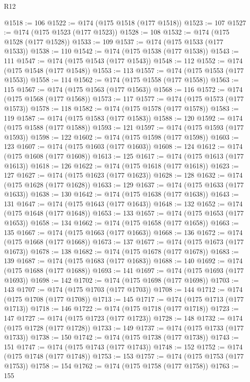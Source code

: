 \begin{lexlean}{R12}
\begin{coremodule}
@1518 := 106
@1522 := @174 (@175 @1518 (@177 @1518))
@1523 := 107
@1527 := @174 (@175 @1523 (@177 @1523))
@1528 := 108
@1532 := @174 (@175 @1528 (@177 @1528))
@1533 := 109
@1537 := @174 (@175 @1533 (@177 @1533))
@1538 := 110
@1542 := @174 (@175 @1538 (@177 @1538))
@1543 := 111
@1547 := @174 (@175 @1543 (@177 @1543))
@1548 := 112
@1552 := @174 (@175 @1548 (@177 @1548))
@1553 := 113
@1557 := @174 (@175 @1553 (@177 @1553))
@1558 := 114
@1562 := @174 (@175 @1558 (@177 @1558))
@1563 := 115
@1567 := @174 (@175 @1563 (@177 @1563))
@1568 := 116
@1572 := @174 (@175 @1568 (@177 @1568))
@1573 := 117
@1577 := @174 (@175 @1573 (@177 @1573))
@1578 := 118
@1582 := @174 (@175 @1578 (@177 @1578))
@1583 := 119
@1587 := @174 (@175 @1583 (@177 @1583))
@1588 := 120
@1592 := @174 (@175 @1588 (@177 @1588))
@1593 := 121
@1597 := @174 (@175 @1593 (@177 @1593))
@1598 := 122
@1602 := @174 (@175 @1598 (@177 @1598))
@1603 := 123
@1607 := @174 (@175 @1603 (@177 @1603))
@1608 := 124
@1612 := @174 (@175 @1608 (@177 @1608))
@1613 := 125
@1617 := @174 (@175 @1613 (@177 @1613))
@1618 := 126
@1622 := @174 (@175 @1618 (@177 @1618))
@1623 := 127
@1627 := @174 (@175 @1623 (@177 @1623))
@1628 := 128
@1632 := @174 (@175 @1628 (@177 @1628))
@1633 := 129
@1637 := @174 (@175 @1633 (@177 @1633))
@1638 := 130
@1642 := @174 (@175 @1638 (@177 @1638))
@1643 := 131
@1647 := @174 (@175 @1643 (@177 @1643))
@1648 := 132
@1652 := @174 (@175 @1648 (@177 @1648))
@1653 := 133
@1657 := @174 (@175 @1653 (@177 @1653))
@1658 := 134
@1662 := @174 (@175 @1658 (@177 @1658))
@1663 := 135
@1667 := @174 (@175 @1663 (@177 @1663))
@1668 := 136
@1672 := @174 (@175 @1668 (@177 @1668))
@1673 := 137
@1677 := @174 (@175 @1673 (@177 @1673))
@1678 := 138
@1682 := @174 (@175 @1678 (@177 @1678))
@1683 := 139
@1687 := @174 (@175 @1683 (@177 @1683))
@1688 := 140
@1692 := @174 (@175 @1688 (@177 @1688))
@1693 := 141
@1697 := @174 (@175 @1693 (@177 @1693))
@1698 := 142
@1702 := @174 (@175 @1698 (@177 @1698))
@1703 := 143
@1707 := @174 (@175 @1703 (@177 @1703))
@1708 := 144
@1712 := @174 (@175 @1708 (@177 @1708))
@1713 := 145
@1717 := @174 (@175 @1713 (@177 @1713))
@1718 := 146
@1722 := @174 (@175 @1718 (@177 @1718))
@1723 := 147
@1727 := @174 (@175 @1723 (@177 @1723))
@1728 := 148
@1732 := @174 (@175 @1728 (@177 @1728))
@1733 := 149
@1737 := @174 (@175 @1733 (@177 @1733))
@1738 := 150
@1742 := @174 (@175 @1738 (@177 @1738))
@1743 := 151
@1747 := @174 (@175 @1743 (@177 @1743))
@1748 := 152
@1752 := @174 (@175 @1748 (@177 @1748))
@1753 := 153
@1757 := @174 (@175 @1753 (@177 @1753))
@1758 := 154
@1762 := @174 (@175 @1758 (@177 @1758))
@1763 := 155

\end{coremodule}
\end{lexlean}
